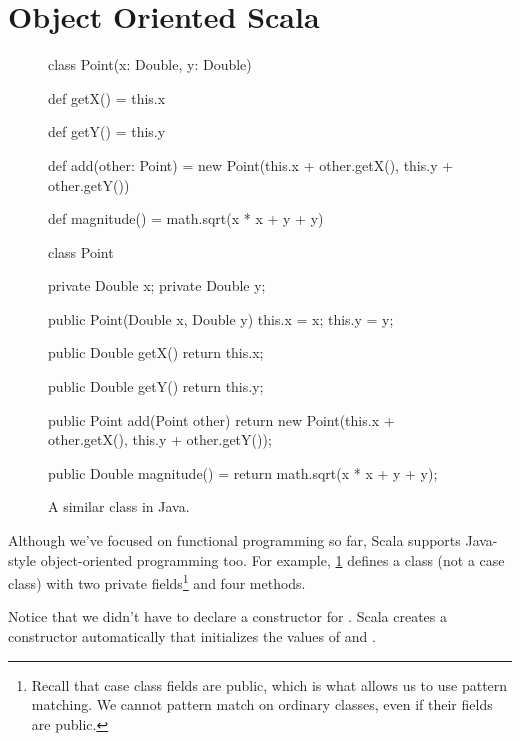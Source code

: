 \documentclass[9pt]{extbook}
\begin{document}
\section{Object Oriented Scala}

\begin{figure}
\begin{minipage}{0.45\textwidth}
\begin{scalacode}
class Point(x: Double, y: Double) {

  def getX() = this.x

  def getY() = this.y

  def add(other: Point) = {
    new Point(this.x + other.getX(),
              this.y + other.getY())
  }

  def magnitude() = math.sqrt(x * x + y + y)
}
\end{scalacode}
\caption{A class for points.}\label{pointclass}
\end{minipage}
\quad\vrule\quad
\begin{minipage}{0.45\textwidth}
\begin{javacode}
class Point {
  private Double x;
  private Double y;

  public Point(Double x, Double y) {
    this.x = x;
    this.y = y;
  }

  public Double getX() {
    return this.x;
  }

  public Double getY() {
    return this.y;
  }

  public Point add(Point other) {
    return new Point(this.x + other.getX(),
                     this.y + other.getY());
  }

  public Double magnitude() = {
    return math.sqrt(x * x + y + y);
  }
}
\end{javacode}
\caption{A similar class in Java.}
\end{minipage}
\end{figure}

Although we've focused on functional programming so far, Scala supports
Java-style object-oriented programming too. For example, \cref{pointclass}
defines a  class (not a case class) with two private
fields\footnote{Recall that case class fields are public, which
is what allows us to use pattern matching. We cannot pattern match on ordinary classes,
even if their fields are public.} and four methods.

Notice that we didn't have to declare a constructor for .
Scala creates a constructor automatically that initializes the values of
 and .
\end{document}
